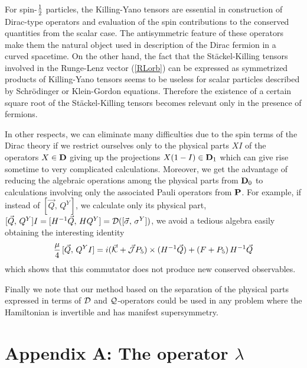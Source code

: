 \documentclass[a4paper,12pt]{article}
\begin{document}
For spin-${1\over 2}$ particles, the Killing-Yano tensors are essential 
in construction of Dirac-type operators and evaluation of the spin 
contributions to the conserved quantities from the scalar case.  The 
antisymmetric feature of these operators make them the natural object 
used in description of the Dirac fermion in a curved spacetime. On the 
other hand, the fact that the St\" ackel-Killing tensors involved in 
the Runge-Lenz vector (\ref{RLorb}) can be expressed as symmetrized 
products of Killing-Yano tensors seems to be useless for scalar 
particles described by Schr\" odinger or Klein-Gordon equations. 
Therefore the existence of a certain square root of the 
St\" ackel-Killing tensors becomes relevant only in the presence of 
fermions.

In other respects, we can eliminate many difficulties due to the spin terms 
of the Dirac theory if we restrict ourselves only to 
the physical parts $XI$ of the operators $X\in {\bf D}$ giving up the 
projections $X(1-I)\in {\bf D}_{1}$  which can give rise  sometime to 
very complicated calculations. Moreover, we get the advantage  
of reducing the algebraic operations among the physical parts from 
${\bf D}_0$ to calculations involving only the associated Pauli operators 
from ${\bf P}$. For example, if instead of $[\vec{Q},\,Q^Y]$, we calculate 
only its physical part,  $[\vec{Q},\,Q^Y]I=[H^{-1}\vec{Q},\,HQ^Y]= 
{\cal D}([\vec{\sigma},\,\sigma^Y])$, we avoid a tedious algebra
easily obtaining the interesting identity
\begin{equation}
\frac{\mu}{4}\,[\vec{Q},\,Q^YI]= i(\vec{\cal K}+\vec{\cal J}P_{5})\times 
(H^{-1}\vec{Q})  + (F+P_5)\,H^{-1}\vec{Q}
\end{equation}  
which shows that this commutator does not produce new conserved 
observables.

 
Finally we note that our method based on the separation of the 
physical parts expressed in terms of ${\cal D}$ and ${\cal Q}$-operators 
could be used in any problem where the Hamiltonian is invertible and has 
manifest supersymmetry.   



\setcounter{equation}{0} \renewcommand{\theequation}
{A.\arabic{equation}}

\section*{Appendix A: The operator $\lambda$} 
\end{document}
